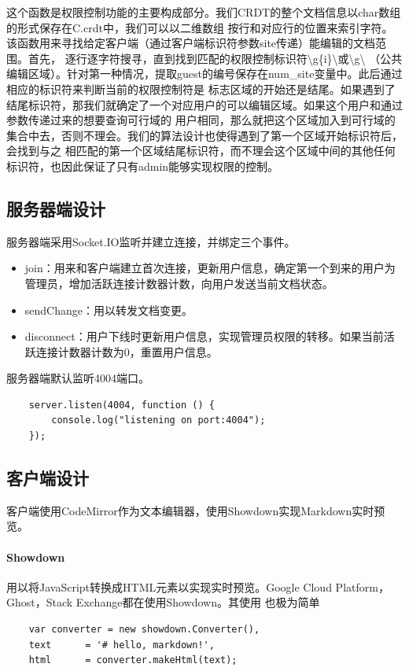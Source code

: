 \documentclass[11pt]{ctexart}
\begin{document}
这个函数是权限控制功能的主要构成部分。我们CRDT的整个文档信息以char数组的形式保存在\textsf{C.crdt}中，我们可以以二维数组
按行和对应行的位置来索引字符。该函数用来寻找给定客户端（通过客户端标识符参数\textsf{site}传递）能编辑的文档范围。首先，
逐行逐字符搜寻，直到找到匹配的权限控制标识符\textsf{\textbackslash g\{i\}\textbackslash}或\textsf{\textbackslash g\textbackslash}
（公共编辑区域）。针对第一种情况，提取guest的编号保存在\textsf{num\_site}变量中。此后通过相应的标识符来判断当前的权限控制符是
标志区域的开始还是结尾。如果遇到了结尾标识符，那我们就确定了一个对应用户的可以编辑区域。如果这个用户和通过参数传递过来的想要查询可行域的
用户相同，那么就把这个区域加入到可行域的集合中去，否则不理会。我们的算法设计也使得遇到了第一个区域开始标识符后，会找到与之
相匹配的第一个区域结尾标识符，而不理会这个区域中间的其他任何标识符，也因此保证了只有admin能够实现权限的控制。

\subsection{服务器端设计}
服务器端采用Socket.IO监听并建立连接，并绑定三个事件。
\begin{itemize}
    \item \textsf{join}：用来和客户端建立首次连接，更新用户信息，确定第一个到来的用户为管理员，增加活跃连接计数器计数，向用户发送当前文档状态。
    \item \textsf{sendChange}：用以转发文档变更。
    \item \textsf{disconnect}：用户下线时更新用户信息，实现管理员权限的转移。如果当前活跃连接计数器计数为0，重置用户信息。
\end{itemize}

服务器端默认监听4004端口。
\begin{verbatim}
    server.listen(4004, function () {
        console.log("listening on port:4004");
    });
\end{verbatim}

\subsection{客户端设计}
客户端使用CodeMirror作为文本编辑器，使用Showdown实现Markdown实时预览。
\paragraph{Showdown}
用以将JavaScript转换成HTML元素以实现实时预览。Google Cloud Platform，Ghost，Stack Exchange都在使用Showdown。其使用
也极为简单
\begin{verbatim}
    var converter = new showdown.Converter(),
    text      = '# hello, markdown!',
    html      = converter.makeHtml(text);
\end{verbatim}
\end{document}
